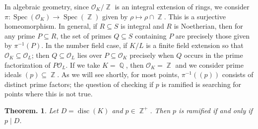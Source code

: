 \documentclass[11pt, a4paper]{memoir}
\DeclareMathOperator{\Q}{{\mathbb{Q}}}
\DeclareMathOperator{\Z}{{\mathbb{Z}}}
\theoremstyle{change}
\newtheorem{theorem}{Theorem.}[section]
\theoremstyle{plain}
\theoremstyle{nonumberplain}
\DeclareMathOperator{\disc}{disc}
\DeclareMathOperator{\Spec}{Spec}
\numberwithin{equation}{section}
\begin{document}
In algebraic geometry, since $\mathcal{O}_K/\Z$ is an integral extension of rings, we consider $\pi:\Spec(\mathcal{O}_K)\to\Spec(\Z)$ given by $\rho\mapsto\rho\cap\Z$.
This is a surjective homeomorphism.
In general, if $R\subseteq S$ is integral and $R$ is Noetherian, then for any prime $P\subseteq R$, the set of primes $Q\subseteq S$ containing $P$ are precisely those given by $\pi^{-1}(P)$.
In the number field case, if $K/L$ is a finite field extension so that $\mathcal{O}_K\subseteq\mathcal{O}_L$; then $Q\subseteq\mathcal{O}_L$ lies over $P\subseteq\mathcal{O}_K$ precisely when $Q$ occurs in the prime factorization of $P\mathcal{O}_L$.
If we take $K=\Q$, then $\mathcal{O}_K=\Z$ and we consider prime ideals $(p)\subseteq\Z$.
As we will see shortly, for most points, $\pi^{-1}((p))$ consists of distinct prime factors; the question of checking if $p$ is ramified is searching for points where this is not true.
\begin{theorem}\label{t:id-ram}
    Let $D=\disc(K)$ and $p\in\Z^+$.
    Then $p$ is ramified if and only if $p\mid D$.
\end{theorem}
\end{document}
